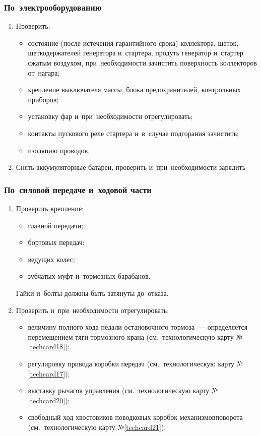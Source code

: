 \subsubsection{По~электрооборудованию}
\begin{enumerate}
    \item Проверить: 
        \begin{itemize}
            \item состояние (после истечения гарантийного срока) коллектора, щеток, щеткодержателей генератора и~стартера, продуть генератор и~стартер сжатым воздухом, при~необходимости зачистить поверхность коллекторов от~нагара; 
            \item крепление выключателя массы, блока предохранителей, контрольных приборов; 
            \item установку фар и~при~необходимости отрегулировать; 
            \item контакты пускового реле стартера и~в~случае подгорания зачистить; 
            \item изоляцию проводов. 
        \end{itemize}
    \item Снять аккумуляторные батареи, проверить и~при~необходимости зарядить
\end{enumerate}

\subsubsection{По~силовой передаче и~ходовой части}
\begin{enumerate}
    \item Проверить крепление: 
        \begin{itemize}
            \item главной передачи; 
            \item бортовых передач; 
            \item ведущих колес; 
            \item зубчатых муфт и~тормозных барабанов. 
        \end{itemize}
        Гайки и~болты должны быть затянуты до~отказа. 
        
    \item Проверить и~при~необходимости отрегулировать: 
        \begin{itemize}
            \item величину полного хода педали остановочного тормоза~--- определяется перемещением тяги тормозного крана (см.~технологическую карту №\ref{techcard18}); 
            \item регулировку привода коробки передач (см.~технологическую карту №\ref{techcard17}); 
            \item выставку рычагов управления (см.~технологическую карту №\ref{techcard20}); 
            \item свободный ход хвостовиков поводковых коробок механизмовповорота (см.~технологическую карту №\ref{techcard21}). 
        \end{itemize}
\end{enumerate}

